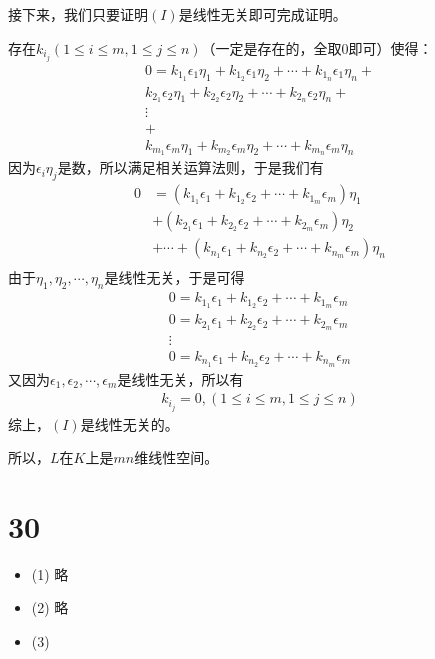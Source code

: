 \documentclass{article}
\begin{document}
接下来，我们只要证明$(I)$是线性无关即可完成证明。

存在$k_{i_j} (1 \leq i \leq m, 1 \leq j \leq n)$（一定是存在的，全取0即可）使得：
\begin{align*}
  0 =
  k_{1_1} \epsilon_1 \eta_1 + k_{1_2} \epsilon_1 \eta_2 + \cdots + k_{1_n} \epsilon_1 \eta_n + \\
  k_{2_1} \epsilon_2 \eta_1 + k_{2_2} \epsilon_2 \eta_2 + \cdots + k_{2_n} \epsilon_2 \eta_n + \\
  \vdots                                                                                       \\
  +                                                                                            \\
  k_{m_1} \epsilon_m \eta_1 + k_{m_2} \epsilon_m \eta_2 + \cdots + k_{m_n} \epsilon_m \eta_n
\end{align*}
因为$\epsilon_i \eta_j$是数，所以满足相关运算法则，于是我们有
\begin{align*}
  0 & = (k_{1_1} \epsilon_1 + k_{1_2} \epsilon_2 + \cdots + k_{1_m} \epsilon_m)\eta_1          \\
    & + (k_{2_1} \epsilon_1 + k_{2_2} \epsilon_2 + \cdots + k_{2_m} \epsilon_m)\eta_2          \\
    & + \cdots + (k_{n_1} \epsilon_1 + k_{n_2} \epsilon_2 + \cdots + k_{n_m} \epsilon_m)\eta_n \\
\end{align*}
由于$\eta_1, \eta_2, \cdots, \eta_n$是线性无关，于是可得
\begin{align*}
  0 = k_{1_1} \epsilon_1 + k_{1_2} \epsilon_2 + \cdots + k_{1_m} \epsilon_m \\
  0 = k_{2_1} \epsilon_1 + k_{2_2} \epsilon_2 + \cdots + k_{2_m} \epsilon_m \\
  \vdots                                                                    \\
  0 = k_{n_1} \epsilon_1 + k_{n_2} \epsilon_2 + \cdots + k_{n_m} \epsilon_m
\end{align*}
又因为$\epsilon_1, \epsilon_2, \cdots, \epsilon_m$是线性无关，所以有
\begin{align*}
  k_{i_j} = 0, (1 \leq i \leq m, 1 \leq j \leq n)
\end{align*}
综上，$(I)$是线性无关的。

所以，$L$在$K$上是$mn$维线性空间。

\section*{30}

\begin{itemize}
  \item (1) 略

  \item (2) 略

  \item (3)
\end{itemize}
\end{document}
